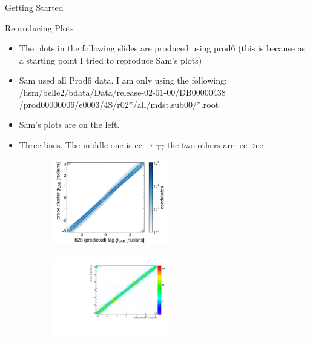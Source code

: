\documentclass[10pt]{beamer}
\begin{document}
{\begin{frame}{Getting Started}
\begin{itemize}
\end{itemize}	
\end{frame}

\begin{frame}{Reproducing Plots}
	
	\begin{itemize}
		\item The plots in the following slides are produced using prod6 (this is because as a starting point I tried to reproduce Sam's plots)
		\item Sam used all Prod6 data. I am only using the following: /hsm/belle2/bdata/Data/release-02-01-00/DB00000438 /prod00000006/e0003/4S/r02*/all/mdst.sub00/*.root
		\item Sam's plots are on the left.	
		\item Three lines. The middle one is $\textrm{ee} \rightarrow \gamma \gamma$ the two others are $\textrm{ee} \rightarrow \textrm{ee}$
\end{itemize}
	
	
	\begin{figure}
		\centering
		\begin{subfigure}{.5\textwidth}
			\centering
			\includegraphics[width=5cm]{Plots/prodRecSam.jpeg}
			
			\label{fig:sub1}
		\end{subfigure}%
		\begin{subfigure}{.5\textwidth}
			\centering
			\includegraphics[width=5cm]{Plots/clusterb2b}
			
			\label{fig:sub2}
		\end{subfigure}
				
		\label{fig:test}
	\end{figure}
	
	
\end{frame}


}
\end{document}
